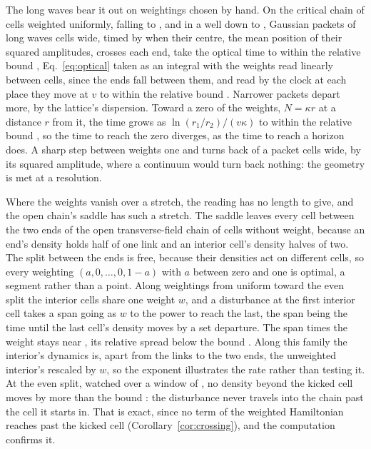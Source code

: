 \documentclass[aps,prd,reprint,superscriptaddress]{revtex4-2}
\begin{document}
The long waves bear it out on weightings chosen by hand. On the critical chain of  cells weighted uniformly, falling to , and in a well down to , Gaussian packets of long waves  cells wide, timed by when their centre, the mean position of their squared amplitudes, crosses each end, take the optical time to within the relative bound , Eq.~\eqref{eq:optical} taken as an integral with the weights read linearly between cells, since the ends fall between them, and read by the clock at each place they move at $v$ to within the relative bound . Narrower packets depart more, by the lattice's dispersion. Toward a zero of the weights, $N = \kappa r$ at a distance $r$ from it, the time grows as $\ln(r_1/r_2)/(v\kappa)$ to within the relative bound , so the time to reach the zero diverges, as the time to reach a horizon does. A sharp step between weights one and  turns back  of a packet  cells wide, by its squared amplitude, where a continuum would turn back nothing: the geometry is met at a resolution.

Where the weights vanish over a stretch, the reading has no length to give, and the open chain's saddle has such a stretch. The saddle leaves every cell between the two ends of the open transverse-field chain of  cells without weight, because an end's density holds half of one link and an interior cell's density halves of two. The split between the ends is free, because their densities act on different cells, so every weighting $(a, 0, \dots, 0, 1-a)$ with $a$ between zero and one is optimal, a segment rather than a point. Along weightings from uniform toward the even split the interior cells share one weight $w$, and a disturbance at the first interior cell takes a span going as $w$ to the power  to reach the last, the span being the time until the last cell's density moves by a set departure. The span times the weight stays near , its relative spread below the bound . Along this family the interior's dynamics is, apart from the links to the two ends, the unweighted interior's rescaled by $w$, so the exponent illustrates the rate rather than testing it. At the even split, watched over a window of , no density beyond the kicked cell moves by more than the bound : the disturbance never travels into the chain past the cell it starts in. That is exact, since no term of the weighted Hamiltonian reaches past the kicked cell (Corollary~\ref{cor:crossing}), and the computation confirms it.
\end{document}
